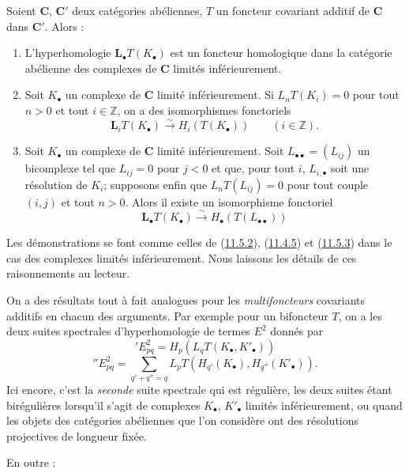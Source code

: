 \begin{proposition}[11.6.3]
\label{0.11.6.3-fr}
Soient $\boldsymbol{C}$, $\boldsymbol{C}'$ deux catégories abéliennes, $T$ un foncteur
covariant additif de $\boldsymbol{C}$ dans $\boldsymbol{C}'$. Alors :
\begin{enumerate}
\item[{\rm(i)}] {L'hyperhomologie $\mathbf{L}_\bullet T(K_\bullet)$ est un
foncteur homologique dans la catégorie abélienne des complexes de
$\boldsymbol{C}$ limités inférieurement.}
\item[{\rm(ii)}] {Soit $K_\bullet$ un complexe de $\boldsymbol{C}$ limité
inférieurement. Si $L_nT(K_i)=0$ pour tout $n>0$ et tout $i\in\mathbb Z$, on
a des isomorphismes fonctoriels}
\[
\label{0.11.6.3.1-fr}
\tag{11.6.3.1}
\mathbf{L}_iT(K_\bullet)\xrightarrow{\sim} H_i(T(K_\bullet))\qquad(i\in\mathbb Z).
\]
\item[{\rm(iii)}] {Soit $K_\bullet$ un complexe de $\boldsymbol{C}$ limité
inférieurement. Soit $L_{\bullet\bullet}=(L_{ij})$ un bicomplexe tel que
$L_{ij}=0$ pour $j<0$ et que, pour tout $i$, $L_{i,\bullet}$ soit une
résolution de $K_i$; supposons enfin que $L_nT(L_{ij})=0$ pour tout couple
$(i,j)$ et tout $n>0$. Alors il existe un isomorphisme fonctoriel}
\[
\label{0.11.6.3.2-fr}
\tag{11.6.3.2}
\mathbf{L}_\bullet T(K_\bullet)\xrightarrow{\sim} H_\bullet(T(L_{\bullet\bullet}))
\]
\end{enumerate}
\upshape Les démonstrations se font comme celles de
(\hyperref[0.11.5.2-fr]{11.5.2}), (\hyperref[0.11.4.5-fr]{11.4.5}) et
(\hyperref[0.11.5.3-fr]{11.5.3}) dans le cas des complexes limités
inférieurement. Nous laissons les détails de ces raisonnements au lecteur.
\end{proposition}

\begin{env}[11.6.4]
\label{0.11.6.4-fr}
On a des résultats tout à fait analogues pour les \emph{multifoncteurs} covariants
additifs en chacun des arguments. Par exemple pour un bifoncteur $T$, on a
les deux suites spectrales d'hyperhomologie de termes $E^2$ donnés par
\[
\label{0.11.6.4.1-fr}
\tag{11.6.4.1}
{}'E^2_{pq}=H_p(L_qT(K_\bullet,K'_\bullet))
\]
\[
\label{0.11.6.4.2-fr}
\tag{11.6.4.2}
{}''E^2_{pq}=
\sum_{q'+q''=q}L_pT(H_{q'}(K_\bullet),H_{q''}(K'_\bullet)).
\]
Ici encore, c'est la \emph{seconde} suite spectrale qui est régulière, les deux
suites étant birégulières lorsqu'il s'agit de complexes $K_\bullet$,
$K'_\bullet$ limités inférieurement, ou quand les objets des catégories
abéliennes que l'on considère ont des résolutions projectives de longueur
fixée.

En outre :
\end{env}

